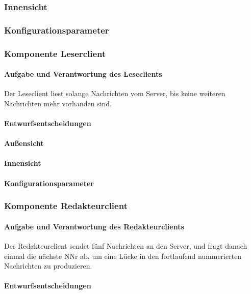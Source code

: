 \documentclass{article}
\begin{document}
\subsubsection{Innensicht}
\subsubsection{Konfigurationsparameter}
\subsubsection{Komponente Leserclient}
    	
    		\paragraph{Aufgabe und Verantwortung des Leseclients}
    		Der Leseclient liest solange Nachrichten vom Server, 
    		bis keine weiteren Nachrichten mehr vorhanden sind.
			\paragraph{Entwurfsentscheidungen}
			\paragraph{Außensicht}
			\paragraph{Innensicht}
			\paragraph{Konfigurationsparameter}
		
		\subsubsection{Komponente Redakteurclient}
		
		    \paragraph{Aufgabe und Verantwortung des Redakteurclients}
		    Der Redakteurclient sendet fünf Nachrichten an den Server, 
		    und fragt danach einmal die nächste NNr ab, um eine Lücke in den fortlaufend 
		    nummerierten Nachrichten zu produzieren.
			\paragraph{Entwurfsentscheidungen}
\end{document}
